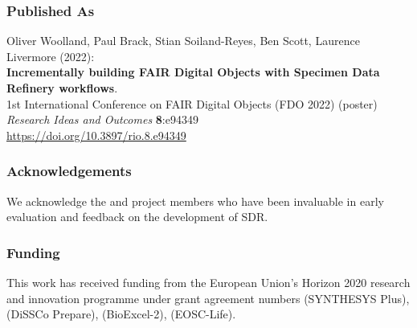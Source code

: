 \subsubsection*{Published As}

Oliver Woolland, Paul Brack, Stian Soiland-Reyes, Ben Scott, Laurence
Livermore (2022):\\
\textbf{Incrementally building FAIR Digital Objects with Specimen Data
Refinery workflows}.\\
1st International Conference on FAIR Digital Objects
(FDO 2022) (poster)\\
\emph{Research Ideas and Outcomes} \textbf{8}:e94349\\
\url{https://doi.org/10.3897/rio.8.e94349}


\subsubsection*{Acknowledgements}

We acknowledge the  and
 project members who have been
invaluable in early evaluation and feedback on the development of SDR.

\hypertarget{funding-2}{%
\subsubsection*{Funding}\label{funding-2}}

This work has received funding from the European Union's Horizon 2020
research and innovation programme under grant agreement numbers
(SYNTHESYS Plus),  (DiSSCo
Prepare),  (BioExcel-2),
 (EOSC-Life).







